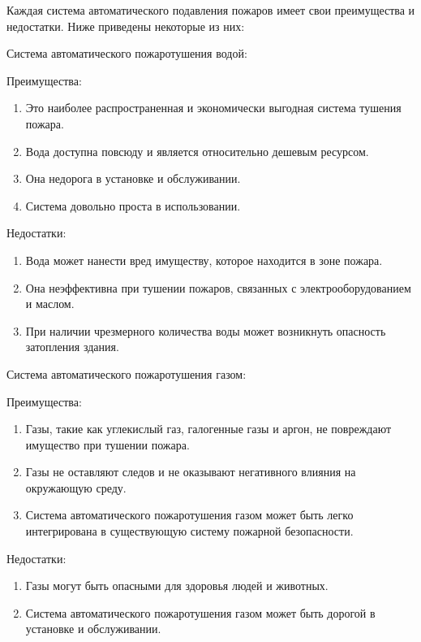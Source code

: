 \begin{multicols}{2}

Каждая система автоматического подавления пожаров имеет свои
преимущества и недостатки. Ниже приведены некоторые из них:

Система автоматического пожаротушения водой:

Преимущества:

\begin{enumerate}
\def\labelenumi{\arabic{enumi}.}
\item
  Это наиболее распространенная и экономически выгодная система тушения
  пожара.
\item
  Вода доступна повсюду и является относительно дешевым ресурсом.
\item
  Она недорога в установке и обслуживании.
\item
  Система довольно проста в использовании.
\end{enumerate}

Недостатки:

\begin{enumerate}
\def\labelenumi{\arabic{enumi}.}
\item
  Вода может нанести вред имуществу, которое находится в зоне пожара.
\item
  Она неэффективна при тушении пожаров, связанных с электрооборудованием
  и маслом.
\item
  При наличии чрезмерного количества воды может возникнуть опасность
  затопления здания.
\end{enumerate}

Система автоматического пожаротушения газом:

Преимущества:

\begin{enumerate}
\def\labelenumi{\arabic{enumi}.}
\item
  Газы, такие как углекислый газ, галогенные газы и аргон, не повреждают
  имущество при тушении пожара.
\item
  Газы не оставляют следов и не оказывают негативного влияния на
  окружающую среду.
\item
  Система автоматического пожаротушения газом может быть легко
  интегрирована в существующую систему пожарной безопасности.
\end{enumerate}

Недостатки:

\begin{enumerate}
\def\labelenumi{\arabic{enumi}.}
\item
  Газы могут быть опасными для здоровья людей и животных.
\item
  Система автоматического пожаротушения газом может быть дорогой в
  установке и обслуживании.
\end{enumerate}


\end{multicols}
